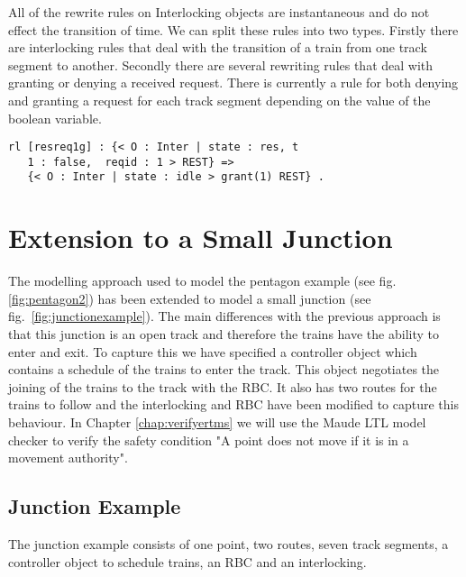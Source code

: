 All of the rewrite rules on Interlocking objects are instantaneous and do not effect the transition of time.  We can split these rules into two types. Firstly there are interlocking rules that deal with the transition of a train from one track segment to another. Secondly there are several rewriting rules that deal with granting or denying a received request. There is currently a rule for both denying and granting a request for each track segment depending on the value of the boolean variable.

\begin{lstlisting}[caption = The interlocking transition which grants a track segment request]
rl [resreq1g] : {< O : Inter | state : res, t
   1 : false,  reqid : 1 > REST} => 
   {< O : Inter | state : idle > grant(1) REST} .
\end{lstlisting}

\section{Extension to a Small Junction}
The modelling approach used to model the pentagon example (see fig. \ref{fig:pentagon2}) has been extended to model a small junction (see fig.~\ref{fig:junctionexample}). The main differences with the previous approach is that this junction is an open track and therefore the trains have the ability to enter and exit. To capture this we have specified a controller object which contains a schedule of the trains to enter the track. This object negotiates the joining of the trains to the track with the RBC. It also has two routes for the trains to follow and the interlocking and RBC have been modified to capture this behaviour.  In Chapter \ref{chap:verifyertms} we will use the Maude LTL model checker to verify the safety condition "A point does not move if it is in a movement authority".
 
\subsection*{Junction Example}
The junction example consists of one point, two routes, seven track segments, a controller object to schedule trains, an RBC and an interlocking.

